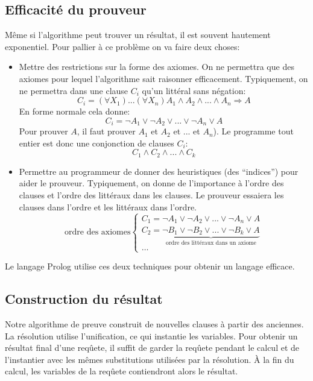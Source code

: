 \subsection{Efficacité du prouveur}

Même si l'algorithme peut trouver un résultat, il est souvent hautement exponentiel.
Pour pallier à ce problème on va faire deux choses:
\begin{itemize}
\item Mettre des restrictions sur la forme des axiomes.
On ne permettra que des axiomes pour lequel l'algorithme sait raisonner efficacement.
Typiquement, on ne permettra dans une clause $C_i$ qu'un littéral sans négation:
	$$C_i = (\forall X_{1}) ... (\forall X_{n}) A_{1} \wedge A_{2} \wedge ... \wedge A_{n} \Rightarrow A$$
En forme normale cela donne:
	$$C_{i} = \neg A_{1} \vee \neg A_{2} \vee ... \vee \neg A_{n} \vee A$$
Pour prouver $A$, il faut prouver $A_{1}$ et $A_{2}$ et ... et $A_{n}$).
Le programme tout entier est donc une conjonction de clauses $C_i$:
	$$C_{1} \wedge C_{2} \wedge ... \wedge C_{k}$$
\item Permettre au programmeur de donner des heuristiques (des ``indices'') pour aider le prouveur.
Typiquement, on donne de l'importance à l'ordre des clauses et l'ordre des littéraux dans les clauses.
Le prouveur essaiera les clauses dans l'ordre et les littéraux dans l'ordre.
	$$\text{ordre des axiomes}\left \{
	\begin{array}{l}
	C_{1} = \neg A_{1} \vee \neg A_{2} \vee ... \vee \neg A_{n} \vee A \\
	C_{2} = \underbrace{\neg B_{1} \vee \neg B_{2} \vee ... \vee \neg B_{k} \vee A}_{\text{ordre des littéraux dans un axiome}}\\
	\ldots
	\end{array}
	\right.$$
\end{itemize}
Le langage Prolog utilise ces deux techniques pour obtenir un langage efficace.

\subsection{Construction du résultat}

Notre algorithme de preuve construit de nouvelles clauses à partir des anciennes.
La résolution utilise l'unification, ce qui instantie les variables.
Pour obtenir un résultat final d'une reqûete, il suffit de garder la reqûete
pendant le calcul et de l'instantier avec les mêmes substitutions utilisées
par la résolution.
À la fin du calcul, les variables de la reqûete contiendront alors le résultat.

